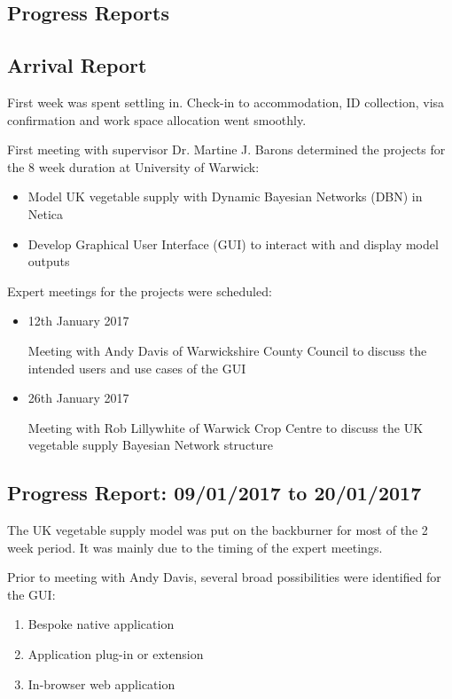 \documentclass[12pt,notitlepage]{article}
\begin{document}
\clearpage
\printbibliography

\clearpage
{}
\appendix
\appendixpage
\addappheadtotoc

\begin{multicols}{2}
\section{Progress Reports}\label{sec:progress}
\subsection{Arrival Report}\label{subsec:arrival}
First week was spent settling in. Check-in to accommodation, ID collection, visa confirmation and work space allocation went smoothly. 

First meeting with supervisor Dr. Martine J. Barons determined the projects for the 8 week duration at University of Warwick:
\begin{itemize}
\item Model UK vegetable supply with Dynamic Bayesian Networks (DBN) in Netica
\item Develop Graphical User Interface (GUI) to interact with and display model outputs
\end{itemize}
Expert meetings for the projects were scheduled:
\begin{itemize}
\item 12th January 2017

Meeting with Andy Davis of Warwickshire County Council to discuss the intended users and use cases of the GUI
\item 26th January 2017

Meeting with Rob Lillywhite of Warwick Crop Centre to discuss the UK vegetable supply Bayesian Network structure
\end{itemize}

\subsection{Progress Report: 09/01/2017 to 20/01/2017}\label{subsec:progress1}
The UK vegetable supply model was put on the backburner for most of the 2 week period. It was mainly due to the timing of the expert meetings.

Prior to meeting with Andy Davis, several broad possibilities were identified for the GUI:
\begin{enumerate}[label=(\Alph*)]
\itemsep0em 
\item Bespoke native application
\item Application plug-in or extension
\item In-browser web application
\end{enumerate}


\end{multicols}
\end{document}
